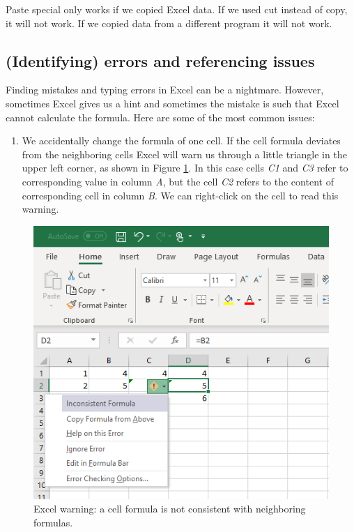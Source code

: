 \documentclass[]{book}
\providecommand{\tightlist}{%
  \setlength{\itemsep}{0pt}\setlength{\parskip}{0pt}}
\begin{document}
Paste special only works if we copied Excel data. If we used cut instead of copy, it will not work. If we copied data from a different program it will not work.

\hypertarget{identifying-errors-and-referencing-issues}{%
\subsection{(Identifying) errors and referencing issues}\label{identifying-errors-and-referencing-issues}}

Finding mistakes and typing errors in Excel can be a nightmare. However, sometimes Excel gives us a hint and sometimes the mistake is such that Excel cannot calculate the formula. Here are some of the most common issues:

\begin{enumerate}
\def\labelenumi{\arabic{enumi}.}
\tightlist
\item
  We accidentally change the formula of one cell. If the cell formula deviates from the neighboring cells Excel will warn us through a little triangle in the upper left corner, as shown in Figure \ref{fig:ex18}. In this case cells \emph{C1} and \emph{C3} refer to corresponding value in column \emph{A}, but the cell \emph{C2} refers to the content of corresponding cell in column \emph{B}. We can right-click on the cell to read this warning.
\end{enumerate}

\begin{figure}

{\centering \includegraphics[width=0.75\linewidth]{_resources/chapter_excelbasic/w1} 

}

\caption{Excel warning: a cell formula is not consistent with neighboring formulas.}\label{fig:ex18}
\end{figure}
\end{document}

